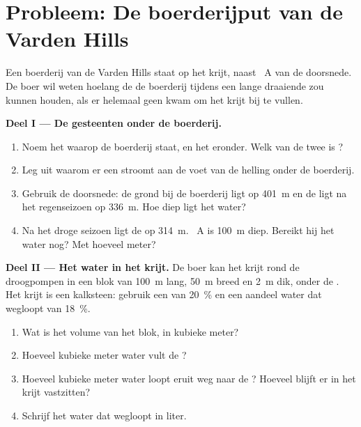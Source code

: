 \section{Probleem: De boerderijput van de Varden Hills}

\begin{problem}
\label{pb:g6:water-underground:1}
Een boerderij van de Varden Hills staat op het krijt, naast ~A van de
doorsnede. De boer wil weten hoelang de  de boerderij tijdens een lange
 draaiende zou kunnen houden, als er helemaal geen  kwam om
het krijt bij te vullen.

\medskip
\noindent\textbf{Deel I --- De gesteenten onder de boerderij.}
\begin{enumerate}
  \item Noem het  waarop de boerderij staat, en het 
        eronder. Welk van de twee is ?
  \item Leg uit waarom er een  stroomt aan de voet van de helling
        onder de boerderij.
  \item Gebruik de doorsnede: de grond bij de boerderij ligt op 401~m en de
         ligt na het regenseizoen op 336~m. Hoe diep ligt
        het water?
  \item Na het droge seizoen ligt de  op 314~m. ~A is
        100~m diep. Bereikt hij het water nog? Met hoeveel meter?
\end{enumerate}

\medskip
\noindent\textbf{Deel II --- Het water in het krijt.}
De boer kan het krijt rond de  droogpompen in een blok van 100~m lang,
50~m breed en 2~m dik, onder de . Het krijt is een
kalksteen: gebruik een  van 20~\% en een aandeel water dat
wegloopt van 18~\%.
\begin{enumerate}[resume]
  \item Wat is het volume van het blok, in kubieke meter?
  \item Hoeveel kubieke meter water vult de ?
  \item Hoeveel kubieke meter water loopt eruit weg naar de ? Hoeveel
        blijft er in het krijt vastzitten?
  \item Schrijf het water dat wegloopt in liter.
\end{enumerate}


\end{problem}

